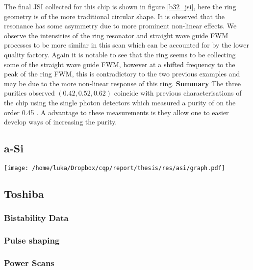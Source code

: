 The final JSI collected for this chip is shown in figure \ref{b32_jsi}, here the ring geometry is of the more traditional circular shape. It is observed that the resonance has some asymmetry due to more prominent non-linear effects. We observe the intensities of the ring resonator and straight wave guide FWM processes to be more similar in this scan which can be accounted for by the lower quality factory. Again it is notable to see that the ring seems to be collecting some of the straight wave guide FWM, however at a shifted frequency to the peak of the ring FWM, this is contradictory to the two previous examples and may be due to the more non-linear response of this ring.
\newline\newline
\noindent
{\bf Summary }The three purities observed $(0.42,0.52,0.62)$ coincide with previous characterisations of the chip using the single photon detectors which measured a purity of on the order 0.45 \cite{scammell_indistinguishable_2014}. A advantage to these measurements is they allow one to easier develop ways of increasing the purity.
\subsection{a-Si}


\begingroup
    \centering  
    \texttt{[image: /home/luka/Dropbox/cqp/report/thesis/res/asi/graph.pdf]}
     \vspace{3pt} \label{asi_jsi_grid}
\endgroup

\subsection{Toshiba}

\subsubsection{Bistability Data}
\subsubsection{Pulse shaping}
\subsubsection{Power Scans}
%